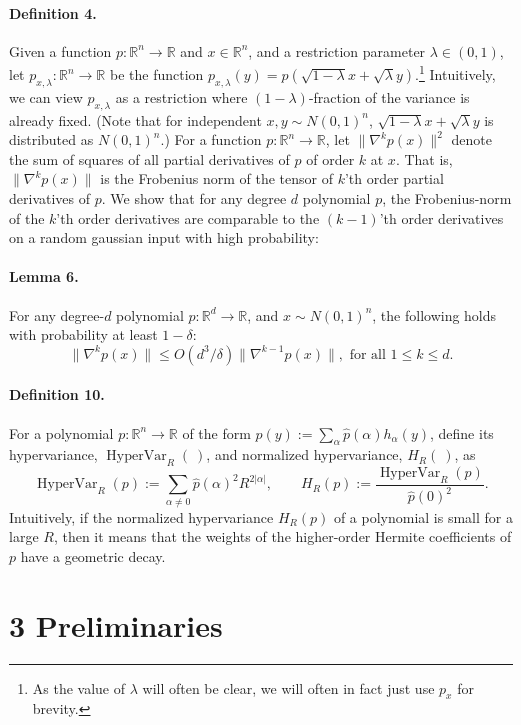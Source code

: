 \paragraph{Definition 4.} Given a function $p:\mathbb R^n\to\mathbb R$ and $x\in\mathbb R^n$, and a restriction parameter $\lambda\in(0,1)$, let $p_{x,\lambda}:\mathbb R^n\to\mathbb R$ be the function $p_{x,\lambda}(y)=p(\sqrt{1-\lambda}x+\sqrt\lambda y)$.\footnote{As the value of $\lambda$ will often be clear, we will often in fact just use $p_x$ for brevity.}
Intuitively, we can view $p_{x,\lambda}$ as a restriction where $(1-\lambda)$-fraction of the variance is already fixed. (Note that for independent $x,y\sim N(0,1)^n$, $\sqrt{1-\lambda}x+\sqrt\lambda y$ is distributed as $N(0,1)^n$.)
For a function $p:\mathbb R^n\to\mathbb R$, let $\|\nabla^kp(x)\|^2$ denote the sum of squares of all partial derivatives of $p$ of order $k$ at $x$. That is, $\|\nabla^kp(x)\|$ is the Frobenius norm of the tensor of $k$'th order partial derivatives of $p$. We show that for any degree $d$ polynomial $p$, the Frobenius-norm of the $k$'th order derivatives are comparable to the $(k-1)$'th order derivatives on a random gaussian input with high probability:
\paragraph{Lemma 6.} For any degree-$d$ polynomial $p:\mathbb R^d\to\mathbb R$, and $x\sim N(0,1)^n$, the following holds with probability at least $1-\delta$:
\[\|\nabla^kp(x)\|\leq O(d^3/\delta)\|\nabla^{k-1}p(x)\|,\text{ for all }1\leq k\leq d.\tag{1}\]
\paragraph{Definition 10.} For a polynomial $p:\mathbb R^n\to\mathbb R$ of the form $p(y):=\sum_\alpha\widehat p(\alpha)h_\alpha(y)$, define its hypervariance, $\operatorname{HyperVar}_R(\ )$, and normalized hypervariance, $H_R(\ )$, as
\[\operatorname{HyperVar}_R(p):=\sum_{\alpha\neq0}\widehat p(\alpha)^2R^{2|\alpha|},\qquad H_R(p):=\frac{\operatorname{HyperVar}_R(p)}{\widehat p(0)^2}.\]
Intuitively, if the normalized hypervariance $H_R(p)$ of a polynomial is small for a large $R$, then it means that the weights of the higher-order Hermite coefficients of $p$ have a geometric decay.
\section*{3 Preliminaries}
